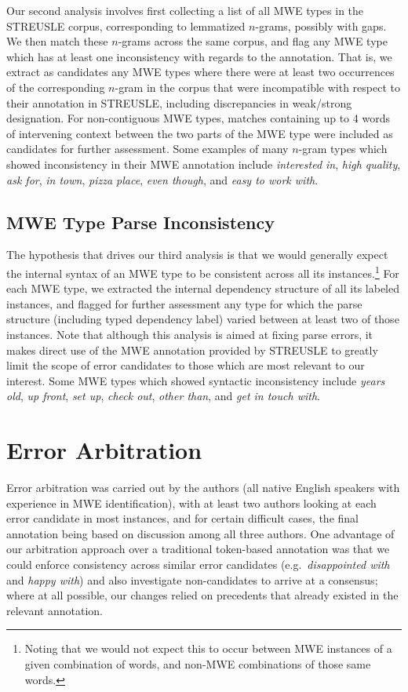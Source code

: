 \documentclass[output=paper
,modfonts
,nonflat]{langsci/langscibook}
\newcommand{\lex}[1]{\textit{#1}\xspace}
\newcommand{\ngram}[1][]{$n$-gram{#1}\xspace}
\begin{document}
Our second analysis involves first collecting a list of all MWE types in the STREUSLE corpus, corresponding to lemmatized \ngram[s], possibly with gaps. We then match these \ngram[s] across the same corpus, and flag any MWE type which has at least one inconsistency with regards to the annotation. That is, we extract as candidates any MWE types where there were at least two occurrences of the corresponding \ngram in the corpus that were incompatible with respect to their annotation in STREUSLE, including discrepancies in weak/strong designation. For non-contiguous MWE types, matches containing up to 4 words of intervening context between the two parts of the MWE type were included as candidates for further assessment. Some examples of many $n$-gram types which showed inconsistency in their MWE annotation include \lex{interested in}, \lex{high quality}, \lex{ask for}, \lex{in town}, \lex{pizza place}, \lex{even though}, and \lex{easy to work with}.

\subsection{MWE Type Parse Inconsistency}

The hypothesis that drives our third analysis is that we would generally expect the internal syntax of an MWE type to be consistent across all its instances.\footnote{Noting that we would not expect this to occur between MWE instances of a given combination of words, and non-MWE combinations of those same words.}  For each MWE type, we extracted the internal dependency structure of all its labeled instances, and flagged for further assessment any type for which the parse structure (including typed dependency label) varied between at least two of those instances. Note that although this analysis is aimed at fixing parse errors, it makes direct use of the MWE annotation provided by STREUSLE to greatly limit the scope of error candidates to those which are most relevant to our interest. Some MWE types which showed syntactic inconsistency include \lex{years old}, \lex{up front}, \lex{set up}, \lex{check out}, \lex{other than}, and \lex{get in touch with}.


\section{Error Arbitration}

Error arbitration was carried out by the authors (all native English speakers with experience in MWE identification), with at least two authors looking at each error candidate in most instances, and for certain difficult cases, the final annotation being based on discussion among all three authors. One advantage of our arbitration approach over a traditional token-based annotation was that we could enforce consistency across similar error candidates (e.g.\ \lex{disappointed with} and \lex{happy with}) and also investigate non-candidates to arrive at a consensus; where at all possible, our changes relied on precedents that already existed in the relevant annotation. 
\end{document}
